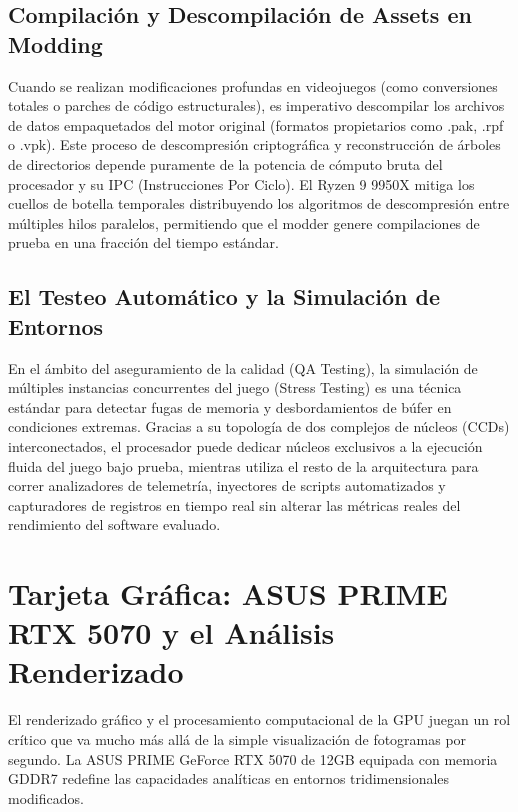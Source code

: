 \documentclass[12pt,a4paper]{article}
\begin{document}
\subsection{Compilación y Descompilación de Assets en Modding}
Cuando se realizan modificaciones profundas en videojuegos (como conversiones totales o parches de código estructurales), es imperativo descompilar los archivos de datos empaquetados del motor original (formatos propietarios como .pak, .rpf o .vpk). Este proceso de descompresión criptográfica y reconstrucción de árboles de directorios depende puramente de la potencia de cómputo bruta del procesador y su IPC (Instrucciones Por Ciclo). El Ryzen 9 9950X mitiga los cuellos de botella temporales distribuyendo los algoritmos de descompresión entre múltiples hilos paralelos, permitiendo que el modder genere compilaciones de prueba en una fracción del tiempo estándar.

\subsection{El Testeo Automático y la Simulación de Entornos}
En el ámbito del aseguramiento de la calidad (QA Testing), la simulación de múltiples instancias concurrentes del juego (Stress Testing) es una técnica estándar para detectar fugas de memoria y desbordamientos de búfer en condiciones extremas. Gracias a su topología de dos complejos de núcleos (CCDs) interconectados, el procesador puede dedicar núcleos exclusivos a la ejecución fluida del juego bajo prueba, mientras utiliza el resto de la arquitectura para correr analizadores de telemetría, inyectores de scripts automatizados y capturadores de registros en tiempo real sin alterar las métricas reales del rendimiento del software evaluado.

\newpage

\section{Tarjeta Gráfica: ASUS PRIME RTX 5070 y el Análisis Renderizado}

El renderizado gráfico y el procesamiento computacional de la GPU juegan un rol crítico que va mucho más allá de la simple visualización de fotogramas por segundo. La ASUS PRIME GeForce RTX 5070 de 12GB equipada con memoria GDDR7 redefine las capacidades analíticas en entornos tridimensionales modificados.
\end{document}
